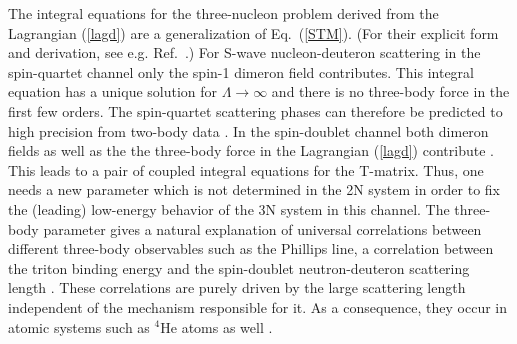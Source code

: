 \documentclass[aps,rmp,nofootinbib,twocolumn,floatfix]{revtex4}
\begin{document}
The integral equations for the three-nucleon problem derived from the
Lagrangian (\ref{lagd}) are a generalization of Eq.~(\ref{STM}).
(For their explicit form and derivation, 
see e.g. Ref.~\cite{Bedaque:2002yg}.)
For S-wave nucleon-deuteron scattering in the spin-quartet channel
only the spin-1 dimeron field contributes. 
This integral equation has a unique solution for $\Lambda \to \infty$ 
and there is no three-body force in the first few orders. The spin-quartet
scattering phases can therefore be predicted to high precision
from two-body data \cite{Bedaque:1997qi,Bedaque:1998mb}.
In the spin-doublet  channel both dimeron fields as well
as the the three-body force in the Lagrangian (\ref{lagd})
contribute \cite{Bedaque:1999ve}. This leads to 
a pair of coupled integral equations for the T-matrix.
Thus, one needs a new parameter which is not determined in the 2N system 
in order to fix the (leading) low-energy behavior of the 3N system in 
this channel. The three-body parameter gives a natural explanation of
universal correlations between different three-body observables such as
the Phillips line, a correlation between the triton binding energy and
the spin-doublet neutron-deuteron scattering length \cite{Phillips68}.
These correlations are purely driven by the large scattering length
independent of the mechanism responsible for it.
As a consequence, they occur in atomic systems such as $^4$He atoms
as well \cite{Braaten:2004rn}.
\end{document}
